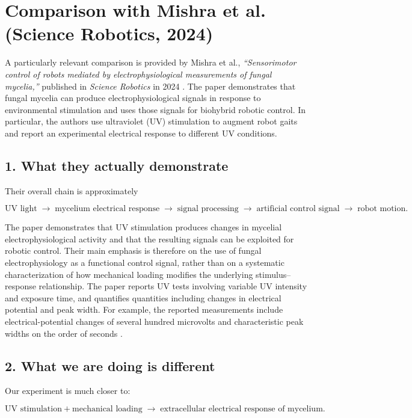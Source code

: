 \documentclass[11pt,a4paper]{article}
\begin{document}
\section{Comparison with Mishra et al. (Science Robotics, 2024)}

A particularly relevant comparison is provided by Mishra et al.,
\emph{``Sensorimotor control of robots mediated by electrophysiological
measurements of fungal mycelia,''} published in \emph{Science Robotics} in
2024 \cite{Mishra2024}. The paper demonstrates that fungal mycelia can produce
electrophysiological signals in response to environmental stimulation and
uses those signals for biohybrid robotic control. In particular, the authors
use ultraviolet (UV) stimulation to augment robot gaits and report an
experimental electrical response to different UV conditions.

\subsection{1. What they actually demonstrate}

Their overall chain is approximately

\[
\text{UV light}
\;\longrightarrow\;
\text{mycelium electrical response}
\;\longrightarrow\;
\text{signal processing}
\;\longrightarrow\;
\text{artificial control signal}
\;\longrightarrow\;
\text{robot motion}.
\]

The paper demonstrates that UV stimulation produces changes in mycelial
electrophysiological activity and that the resulting signals can be exploited
for robotic control. Their main emphasis is therefore on the use of fungal
electrophysiology as a functional control signal, rather than on a systematic
characterization of how mechanical loading modifies the underlying
stimulus--response relationship. The paper reports UV tests involving
variable UV intensity and exposure time, and quantifies quantities including
changes in electrical potential and peak width. For example, the reported
measurements include electrical-potential changes of several hundred
microvolts and characteristic peak widths on the order of seconds
\cite{Mishra2024}.

\subsection{2. What we are doing is different}

Our experiment is much closer to:

\[
\text{UV stimulation} + \text{mechanical loading}
\;\longrightarrow\;
\text{extracellular electrical response of mycelium}.
\]
\end{document}
